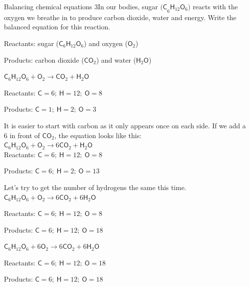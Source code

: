       \noindent
\begin{wex}{Balancing chemical equations 3}{In our bodies, sugar ${\mathsf{(C}_{6}\mathsf{H}_{12}\mathsf{O}_{6}\mathsf{)}}$ reacts with the oxygen we breathe in to produce carbon dioxide, water and energy. Write the balanced equation for this reaction.}

{
Reactants: sugar (${\mathsf{C}_{6}\mathsf{H}_{12}\mathsf{O}_{6}}$) and oxygen (${\mathsf{O}_{2}}$)

Products: carbon dioxide (${\mathsf{CO}_{2}}$) and water (${\mathsf{H}_{2}\mathsf{O}}$)\\
}
{
    $\mathsf{C}_{6}\mathsf{H}_{12}\mathsf{O}_{6} + \mathsf{O}_{2} \rightarrow \mathsf{CO}_{2} + \mathsf{H}_{2}\mathsf{O}$
}
{
   Reactants: $\mathsf{C} = 6;~ \mathsf{H} = 12; ~\mathsf{O} = 8$

   Products: $\mathsf{C} = 1;~ \mathsf{H} = 2; ~\mathsf{O} = 3$
}
{
   It is easier to start with carbon as it only appears once on each side. If we add a $6$ in front of ${\mathsf{CO}_{2}}$, the equation looks like this:\\
    $\mathsf{C}_{6}\mathsf{H}_{12}\mathsf{O}_{6} + \mathsf{O}_{2} \rightarrow 6\mathsf{CO}_{2} + \mathsf{H}_{2}\mathsf{O}$\\

   Reactants: $\mathsf{C} = 6;~ \mathsf{H} = 12; ~\mathsf{O} = 8$

   Products: $\mathsf{C} = 6;~ \mathsf{H} = 2; ~\mathsf{O} = 13$
}
{
Let's try to get the number of hydrogens the same this time.\\
    $\mathsf{C}_{6}\mathsf{H}_{12}\mathsf{O}_{6} + \mathsf{O}_{2} \rightarrow 6\mathsf{CO}_{2} + 6\mathsf{H}_{2}\mathsf{O}$

   Reactants: $\mathsf{C} = 6;~ \mathsf{H} = 12; ~\mathsf{O} = 8$

   Products: $\mathsf{C} = 6;~ \mathsf{H} = 12; ~\mathsf{O} = 18$
}
{
  $\mathsf{C}_{6}\mathsf{H}_{12}\mathsf{O}_{6} + 6\mathsf{O}_{2} \rightarrow 6\mathsf{CO}_{2} + 6\mathsf{H}_{2}\mathsf{O}$

   Reactants: $\mathsf{C} = 6;~ \mathsf{H} = 12; ~\mathsf{O} = 18$

   Products: $\mathsf{C} = 6;~ \mathsf{H} = 12; ~\mathsf{O} = 18$
}
\end{wex}

